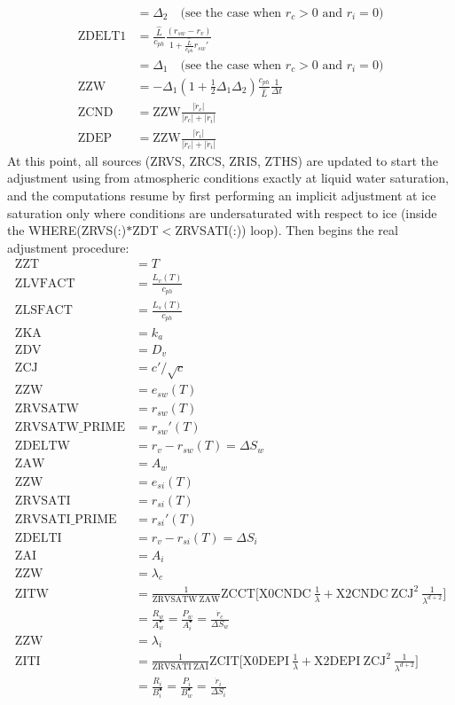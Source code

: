 {\begin{align}
 &= \Delta_2 \quad \text{(see the case when $r_c>0$ and $r_i=0$)}\\
 \mathrm{ZDELT1} &= \frac{\hat{L}}{c_{ph}} \frac{(r_{sw}-r_v)}{1 + \frac{\hat{L}}{c_{ph}} r_{sw}'} \\
 &= \Delta_1 \quad \text{(see the case when $r_c>0$ and $r_i=0$)}\\
 \mathrm{ZZW} &= - \Delta_1 \left( 1 + \frac{1}{2} \Delta_1 \Delta_2 \right) \frac{c_{ph}}{\hat{L}} \frac{1}{\Delta t} \\
 \mathrm{ZCND} &= \mathrm{ZZW} \frac{|\dot{r}_c|}{|\dot{r}_c| + |\dot{r}_i|} \\
 \mathrm{ZDEP} &= \mathrm{ZZW} \frac{|\dot{r}_i|}{|\dot{r}_c| + |\dot{r}_i|}
 \end{align}
 At this point, all sources (ZRVS, ZRCS, ZRIS, ZTHS) are updated to start the adjustment using \citet{Reisin1996} from atmospheric conditions exactly at liquid water saturation, and the computations resume by first performing an implicit adjustment at ice saturation only where conditions are undersaturated with respect to ice (inside the WHERE(ZRVS(:)$*$ZDT$<$ZRVSATI(:)) loop). Then begins the real adjustment procedure:
 \begin{align}
 \mathrm{ZZT} &= T \\
 \mathrm{ZLVFACT} &= \frac{L_v(T)}{c_{ph}} \\
 \mathrm{ZLSFACT} &= \frac{L_s(T)}{c_{ph}} \\
 \mathrm{ZKA} &= k_a \\
 \mathrm{ZDV} &= D_v \\
 \mathrm{ZCJ} &= c'/\sqrt c \\
 \mathrm{ZZW} &= e_{sw}(T) \\
 \mathrm{ZRVSATW} &= r_{sw}(T) \\
 \mathrm{ZRVSATW\_PRIME} &= r_{sw}'(T) \\
 \mathrm{ZDELTW} &= r_v - r_{sw}(T) = \Delta S_w \\
 \mathrm{ZAW} &= A_w \\
 \mathrm{ZZW} &= e_{si}(T) \\
 \mathrm{ZRVSATI} &= r_{si}(T) \\
 \mathrm{ZRVSATI\_PRIME} &= r_{si}'(T) \\
 \mathrm{ZDELTI} &= r_v - r_{si}(T) = \Delta S_i \\
 \mathrm{ZAI} &= A_i \\
 \mathrm{ZZW} &= \lambda_c \\
 \mathrm{ZITW} &= \frac{1}{\mathrm{ZRVSATW} ~ \mathrm{ZAW}} \mathrm{ZCCT} \bigg[\mathrm{X0CNDC} ~ \frac{1}{\lambda} + \mathrm{X2CNDC} ~ \mathrm{ZCJ}^2 ~ \frac{1}{\lambda^{d+2}}\bigg]  \\ 
 &= \frac{R_w}{A_w^\bullet} = \frac{P_w}{A_i^\bullet} = \frac{\dot{r}_c}{\Delta S_w} \\
 \mathrm{ZZW} &= \lambda_i \\
 \mathrm{ZITI} &= \frac{1}{\mathrm{ZRVSATI} ~ \mathrm{ZAI}} \mathrm{ZCIT} \bigg[\mathrm{X0DEPI} ~ \frac{1}{\lambda} + \mathrm{X2DEPI} ~ \mathrm{ZCJ}^2 ~ \frac{1}{\lambda^{d+2}}\bigg]  \\ 
 &= \frac{R_i}{B_i^\bullet} = \frac{P_i}{B_w^\bullet} = \frac{\dot{r}_i}{\Delta S_i}
 \end{align}
 
}
